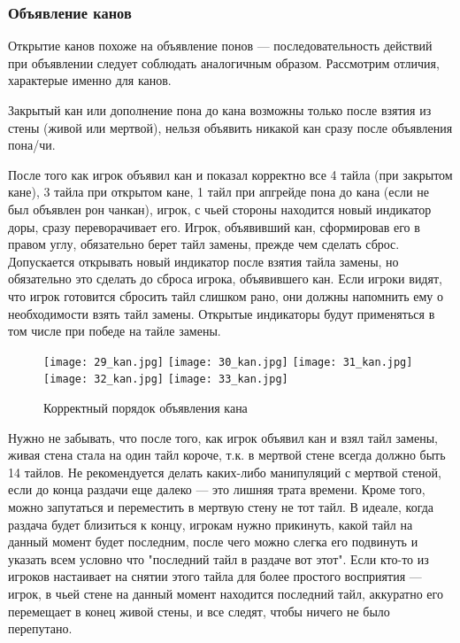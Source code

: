 \subsubsection{Объявление канов}

Открытие канов похоже на объявление понов --- последовательность действий при объявлении следует соблюдать аналогичным образом. Рассмотрим отличия, характерые именно для канов.

Закрытый кан или дополнение пона до кана возможны только после взятия из стены (живой или мертвой), нельзя объявить никакой кан сразу после объявления пона/чи.

После того как игрок объявил кан и показал корректно все 4 тайла (при закрытом кане), 3 тайла при открытом кане, 1 тайл при апгрейде пона до кана (если не был объявлен рон чанкан), игрок, с чьей стороны находится новый индикатор доры, сразу переворачивает его. Игрок, объявивший кан, сформировав его в правом углу, обязательно берет тайл замены, прежде чем сделать сброс. Допускается открывать новый индикатор после взятия тайла замены, но обязательно это сделать до сброса игрока, объявившего кан. Если игроки видят, что игрок готовится сбросить тайл слишком рано, они должны напомнить ему о необходимости взять тайл замены. Открытые индикаторы будут применяться в том числе при победе на тайле замены.

\begin{figure}[H]
	\centering
	\texttt{[image: 29\_kan.jpg]}
	\texttt{[image: 30\_kan.jpg]}
	\texttt{[image: 31\_kan.jpg]}
	\texttt{[image: 32\_kan.jpg]}
	\texttt{[image: 33\_kan.jpg]}
	\caption{Корректный порядок объявления кана}
\end{figure}

Нужно не забывать, что после того, как игрок объявил кан и взял тайл замены, живая стена стала на один тайл короче, т.к. в мертвой стене всегда должно быть 14 тайлов. Не рекомендуется делать каких-либо манипуляций с мертвой стеной, если до конца раздачи еще далеко --- это лишняя трата времени. Кроме того, можно запутаться и переместить в мертвую стену не тот тайл. В идеале, когда раздача будет близиться к концу, игрокам нужно прикинуть, какой тайл на данный момент будет последним, после чего можно слегка его подвинуть и указать всем условно что "последний тайл в раздаче вот этот". Если кто-то из игроков настаивает на снятии этого тайла для более простого восприятия --- игрок, в чьей стене на данный момент находится последний тайл, аккуратно его перемещает в конец живой стены, и все следят, чтобы ничего не было перепутано.

